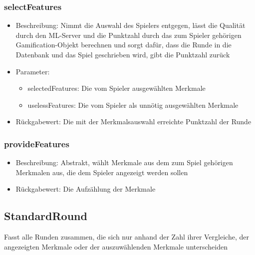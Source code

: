 \documentclass[a4paper]{scrreprt}
\begin{document}
    \subsubsection{selectFeatures}
    \begin{itemize}
        \item Beschreibung: Nimmt die Auswahl des Spielers entgegen, lässt die Qualität durch den ML-Server und die Punktzahl durch das zum Spieler gehörigen Gamification-Objekt berechnen und sorgt dafür, dass die Runde in die Datenbank und das Spiel geschrieben wird, gibt die Punktzahl zurück
        \item Parameter:
        \begin{itemize}
            \item selectedFeatures: Die vom Spieler ausgewählten Merkmale
            \item uselessFeatures: Die vom Spieler als unnötig ausgewählten Merkmale
        \end{itemize}
        \item Rückgabewert: Die mit der Merkmalsauswahl erreichte Punktzahl der Runde
    \end{itemize}
    \subsubsection{provideFeatures}
    \begin{itemize}
        \item Beschreibung: Abstrakt, wählt Merkmale aus dem zum Spiel gehörigen Merkmalen aus, die dem Spieler angezeigt werden sollen
        \item Rückgabewert: Die Aufzählung der Merkmale
    \end{itemize}

    \subsection{StandardRound}
    Fasst alle Runden zusammen, die sich nur anhand der Zahl ihrer Vergleiche, der angezeigten Merkmale oder der auszuwählenden Merkmale unterscheiden
\end{document}
